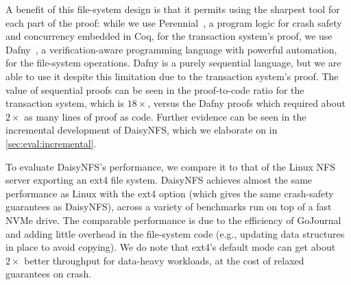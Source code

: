 A benefit of this file-system design is that it permits using the
sharpest tool for each part of the proof: while we use
Perennial~\cite{chajed:gojournal}, a program logic for crash safety
and concurrency embedded in Coq, for the
transaction system's proof, we use Dafny~\cite{leino:dafny}, a verification-aware
programming language with powerful automation, for the file-system operations.
Dafny is a purely sequential language, but we are able to use it despite this
limitation due to the transaction system's proof. The value of
sequential proofs can be seen in the proof-to-code ratio for the transaction
system, which is $18\times$, versus the Dafny proofs which required about
$2\times$ as many lines of proof as code. Further evidence can be seen in the
incremental development of DaisyNFS, which we elaborate on in
\cref{sec:eval:incremental}.


To evaluate DaisyNFS's performance, we compare it to that of the Linux NFS server
exporting an ext4 file system. DaisyNFS achieves almost the same performance as
Linux with the ext4  option (which gives the same crash-safety
guarantees as DaisyNFS), across a variety of benchmarks run on top of a fast NVMe
drive. The comparable performance is due to the efficiency of GoJournal and
adding little overhead in the file-system code (e.g., updating data structures
in place to avoid copying). We do note that ext4's default 
mode can get about $2\times$ better throughput for data-heavy workloads, at the
cost of relaxed guarantees on crash.

